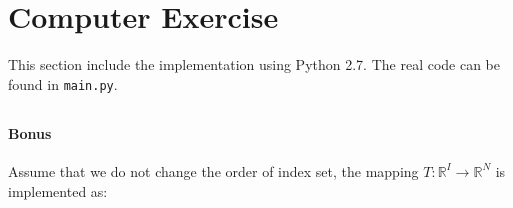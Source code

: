 \section{Computer Exercise}\label{sec:part5}
This section include the implementation using Python 2.7. The real code can be found in \texttt{main.py}.

\subsection{}\label{subsec:p5-a}



\subsection{}\label{subsec:p5-b}


\subsection{}\label{subsec:p5-c}



\subsection{}\label{subsec:p5-d}



\paragraph{Bonus} Assume that we do not change the order of index set, the mapping $T: \mathbb{R}^I \rightarrow \mathbb{R}^N$ is implemented as:


\subsection{}\label{subsec:p5-e}

